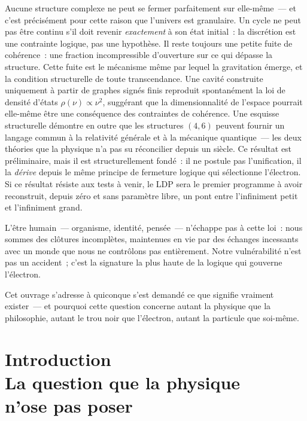 \documentclass[12pt, a4paper, openright]{book}
\begin{document}
Aucune structure complexe ne peut se fermer parfaitement sur elle-même~--- et c'est précisément pour cette raison que l'univers est granulaire. Un cycle ne peut pas être continu s'il doit revenir \emph{exactement} à son état initial~: la discrétion est une contrainte logique, pas une hypothèse. Il reste toujours une petite fuite de cohérence~: une fraction incompressible d'ouverture sur ce qui dépasse la structure. Cette fuite est le mécanisme même par lequel la gravitation émerge, et la condition structurelle de toute transcendance. Une cavité construite uniquement à partir de graphes signés finis reproduit spontanément la loi de densité d'états $\rho(\nu)\propto\nu^{2}$, suggérant que la dimensionnalité de l'espace pourrait elle-même être une conséquence des contraintes de cohérence. Une esquisse structurelle démontre en outre que les structures $(4,6)$ peuvent fournir un langage commun à la relativité générale et à la mécanique quantique~--- les deux théories que la physique n'a pas su réconcilier depuis un siècle. Ce résultat est préliminaire, mais il est structurellement fondé~: il ne postule pas l'unification, il la \emph{dérive} depuis le même principe de fermeture logique qui sélectionne l'électron. Si ce résultat résiste aux tests à venir, le LDP sera le premier programme à avoir reconstruit, depuis zéro et sans paramètre libre, un pont entre l'infiniment petit et l'infiniment grand.

\medskip

L'être humain~--- organisme, identité, pensée~--- n'échappe pas à cette loi~: nous sommes des clôtures incomplètes, maintenues en vie par des échanges incessants avec un monde que nous ne contrôlons pas entièrement. Notre vulnérabilité n'est pas un accident~; c'est la signature la plus haute de la logique qui gouverne l'électron.

\medskip

Cet ouvrage s'adresse à quiconque s'est demandé ce que signifie vraiment exister~--- et pourquoi cette question concerne autant la physique que la philosophie, autant le trou noir que l'électron, autant la particule que soi-même.

\newpage

\chapter*{Introduction \\ La question que la physique \\ n'ose pas poser}
\end{document}
